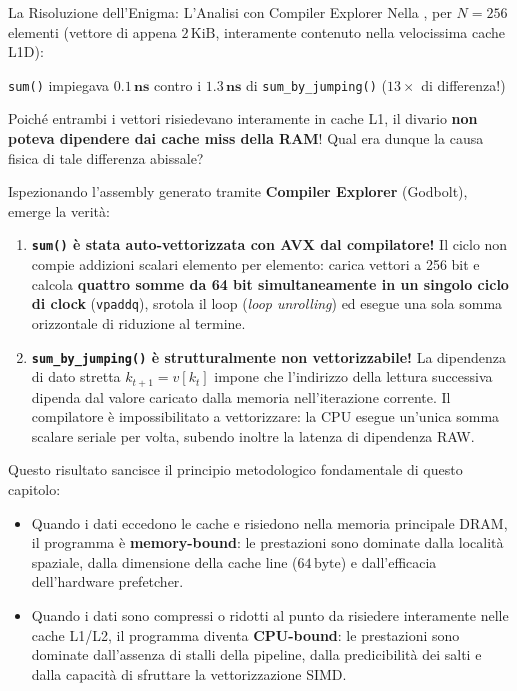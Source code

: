 \begin{alertblock}{La Risoluzione dell'Enigma: L'Analisi con Compiler Explorer}
Nella , per $N=256$ elementi (vettore di appena $2\,\text{KiB}$, interamente contenuto nella velocissima cache L1D):
\begin{center}
\texttt{sum()} impiegava $\mathbf{0.1\,\text{ns}}$ \quad contro i $\mathbf{1.3\,\text{ns}}$ di \texttt{sum\_by\_jumping()} ($13\times$ di differenza!)
\end{center}
Poiché entrambi i vettori risiedevano interamente in cache L1, il divario \textbf{non poteva dipendere dai cache miss della RAM}! Qual era dunque la causa fisica di tale differenza abissale?

Ispezionando l'assembly generato tramite \textbf{Compiler Explorer} (Godbolt), emerge la verit\`a:
\begin{enumerate}
    \item \textbf{\texttt{sum()} \`e stata auto-vettorizzata con AVX dal compilatore!}
    Il ciclo non compie addizioni scalari elemento per elemento: carica vettori a 256 bit e calcola \textbf{quattro somme da 64 bit simultaneamente in un singolo ciclo di clock} (\texttt{vpaddq}), srotola il loop (\textit{loop unrolling}) ed esegue una sola somma orizzontale di riduzione al termine.
    \item \textbf{\texttt{sum\_by\_jumping()} \`e strutturalmente non vettorizzabile!}
    La dipendenza di dato stretta $k_{t+1} = v[k_t]$ impone che l'indirizzo della lettura successiva dipenda dal valore caricato dalla memoria nell'iterazione corrente. Il compilatore \`e impossibilitato a vettorizzare: la CPU esegue un'unica somma scalare seriale per volta, subendo inoltre la latenza di dipendenza RAW.
\end{enumerate}
\end{alertblock}

Questo risultato sancisce il principio metodologico fondamentale di questo capitolo:
\begin{property}
\begin{itemize}
    \item Quando i dati eccedono le cache e risiedono nella memoria principale DRAM, il programma \`e \textbf{memory-bound}: le prestazioni sono dominate dalla localit\`a spaziale, dalla dimensione della cache line ($64\,\text{byte}$) e dall'efficacia dell'hardware prefetcher.
    \item Quando i dati sono compressi o ridotti al punto da risiedere interamente nelle cache L1/L2, il programma diventa \textbf{CPU-bound}: le prestazioni sono dominate dall'assenza di stalli della pipeline, dalla predicibilit\`a dei salti e dalla capacit\`a di sfruttare la vettorizzazione SIMD.
\end{itemize}
\end{property}

